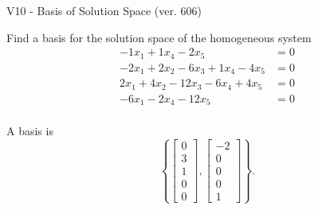 \begin{exercise}
  \begin{exerciseTitle}V10 - Basis of Solution Space (ver. 606)\end{exerciseTitle}
  \begin{exerciseStatement}
    Find a basis for the solution space of the homogeneous system 
\begin{align*}
 -1 x_ 1 + 1 x_ 4 -2 x_ 5 &= 0  \\ 
  -2 x_ 1 + 2 x_ 2 -6 x_ 3 + 1 x_ 4 -4 x_ 5 &= 0  \\ 
  2 x_ 1 + 4 x_ 2 -12 x_ 3 -6 x_ 4 + 4 x_ 5 &= 0  \\ 
  -6 x_ 1 -2 x_ 4 -12 x_ 5 &= 0  \\ 
 \end{align*}


 
  \end{exerciseStatement}

  \begin{exerciseAnswer}
   A basis is   
\[\left\{\left[\begin{array}{c}
0 \\
3 \\
1 \\
0 \\
0
\end{array}\right] , \left[\begin{array}{c}
-2 \\
0 \\
0 \\
0 \\
1
\end{array}\right]\right\}.\]

  


  \end{exerciseAnswer}
\end{exercise}